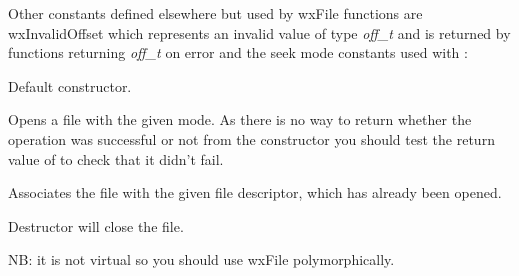 Other constants defined elsewhere but used by wxFile functions are wxInvalidOffset which represents an
invalid value of type {\it off\_t} and is returned by functions returning {\it off\_t} on error and the seek
mode constants used with :

\twocolwidtha{7cm}
\begin{twocollist}\itemsep=0pt%
\end{twocollist}


\label{wxfileconstr}


Default constructor.


Opens a file with the given mode. As there is no way to return whether the
operation was successful or not from the constructor you should test the
return value of  to check that it didn't
fail.


Associates the file with the given file descriptor, which has already been opened.







Destructor will close the file.

NB: it is not virtual so you should use wxFile polymorphically.

\label{wxfileaccess}


